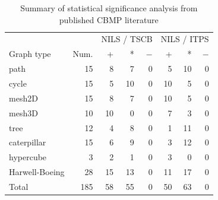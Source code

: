 \begin{table}[t]
\centering
\caption{Summary of statistical significance analysis from published CBMP literature}
\label{tab:published_ref_table3}
\begin{tabular}{lr|rrr|rrr}
\toprule
 & & \multicolumn{3}{c|}{NILS / TSCB} & \multicolumn{3}{c}{NILS / ITPS} \\
Graph type & Num. & + & * & $-$ & + & * & $-$ \\
\midrule
path & 15 & 8 & 7 & 0 & 5 & 10 & 0 \\
cycle & 15 & 5 & 10 & 0 & 10 & 5 & 0 \\
mesh2D & 15 & 8 & 7 & 0 & 10 & 5 & 0 \\
mesh3D & 10 & 10 & 0 & 0 & 7 & 3 & 0 \\
tree & 12 & 4 & 8 & 0 & 1 & 11 & 0 \\
caterpillar & 15 & 6 & 9 & 0 & 3 & 12 & 0 \\
hypercube & 3 & 2 & 1 & 0 & 3 & 0 & 0 \\
Harwell-Boeing & 28 & 15 & 13 & 0 & 11 & 17 & 0 \\
\midrule
Total & 185 & 58 & 55 & 0 & 50 & 63 & 0 \\
\bottomrule
\end{tabular}
\end{table}
